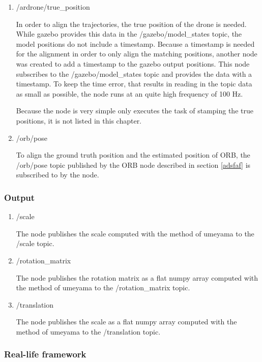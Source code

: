 	\begin{enumerate}
	\item{/ardrone/true\_position}
	
	In order to align the trajectories, the true position of the drone is needed. 
	While gazebo provides this data in the /gazebo/model\_states topic, the model 
	positions do not include a timestamp. Because a timestamp is needed for the alignment 
	in order to only align the matching positions, another node was created to add a timestamp 
	to the gazebo output positions. This node subscribes to the /gazebo/model\_states topic 
	and provides the data with a timestamp. To keep the time error, that results in reading in 
	the topic data as small as possible, 
	the node runs at an quite high frequency of 100 Hz. 
	
	Because the node is very simple only executes the task of stamping the true positions, 
	it is not listed in this chapter. 
	
	\item{/orb/pose}
	
	To align the ground truth position and the estimated position of ORB, the /orb/pose topic published 
	by the ORB node described in section \ref{adsfaf} is subscribed to by the node. 
	
	\end{enumerate}
	
	\subsubsection{Output}
	
	\begin{enumerate}
	\item{/scale}
	
	The node publishes the scale computed with the method of umeyama to  the /scale topic. 
	
	\item{/rotation\_matrix}
	
	The node publishes the rotation matrix as a flat numpy array computed with the method of umeyama to  the /rotation\_matrix topic.
	
	\item{/translation}
	
	The node publishes the scale as a flat numpy array computed with the method of umeyama to  the /translation topic.
	
	\end{enumerate}
	
	\subsubsection{Real-life framework}
	
